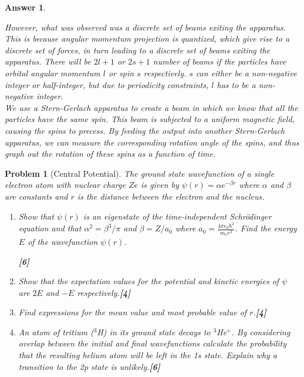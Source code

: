 \documentclass[a4paper]{article}
\newtheorem{ans}{Answer}[subsection]
\theoremstyle{new}
\newtheorem{qns}{Problem}[subsection]
\begin{document}
\begin{ans}
\begin{enumerate}[label=(\alph*)]
However, what was observed was a discrete set of beams exiting the apparatus. This is because angular momentum projection is quantized, which give rise to a discrete set of forces, in turn leading to a discrete set of beams exiting the apparatus. There will be $2l+1$ or $2s+1$ number of beams if the particles have orbital angular momentum $l$ or spin $s$ respectively. $s$ can either be a non-negative integer or half-integer, but due to periodicity constraints, $l$ has to be a non-negative integer.\\[5pt]
We use a Stern-Gerlach apparatus to create a beam in which we know that all the particles have the same spin. This beam is subjected to a uniform magnetic field, causing the spins to precess. By feeding the output into another Stern-Gerlach apparatus, we can measure the corresponding rotation angle of the spins, and thus graph out the rotation of these spins as a function of time.
\end{enumerate}
\end{ans}
\begin{qns}[Central Potential]
The ground state wavefunction of a single electron atom with nuclear charge $Ze$ is given by $\psi(r)=\alpha e^{-\beta r}$ where $\alpha$ and $\beta$ are constants and $r$ is the distance between the electron and the nucleus.
\begin{enumerate}[label=(\alph*)]
\item Show that $\psi(r)$ is an eigenstate of the time-independent Schrödinger equation and that $\alpha^2=\beta^3/\pi$ and $\beta=Z/a_0$ where $a_0 = \frac{4\pi\epsilon_0\hbar^2}{m_ee^2}$. Find the energy $E$ of the wavefunction $\psi(r)$.

\hfill\textbf{[6]}
\item Show that the expectation values for the potential and kinetic energies of $\psi$ are $2E$ and $-E$ respectively.\hfill\textbf{[4]}
\item Find expressions for the mean value and most probable value of $r$.\hfill\textbf{[4]}
\item An atom of tritium ($^3$H) in its ground state decays to $^3$He$^+$. By considering overlap between the initial and final wavefunctions calculate the probability that the resulting helium atom will be left in the 1s state. Explain why a transition to the 2p state is unlikely.\hfill\textbf{[6]}
\end{enumerate}
\begin{mdframed}
\end{mdframed}
\end{qns}
\end{document}

